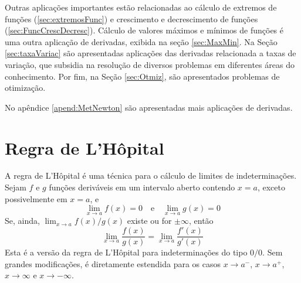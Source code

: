 \cleardoublepage\documentclass[../main.tex]{subfiles}
\begin{document}
 Outras aplicações importantes estão relacionadas ao cálculo de extremos de funções (\autoref{sec:extremosFunc}) e crescimento e decrescimento de funções (\autoref{sec:FuncCrescDecresc}). Cálculo de valores máximos e mínimos de funções é uma outra aplicação de derivadas, exibida na seção  \ref{sec:MaxMin}. Na Seção \ref{sec:taxaVariac} são apresentadas aplicações das derivadas relacionada a taxas de variação, que subsidia na resolução de diversos problemas em diferentes áreas do conhecimento. Por fim, na Seção \ref{sec:Otmiz}, são apresentados problemas de otimização.

No apêndice \ref{apend:MetNewton} são apresentadas mais aplicações de derivadas.

\section{Regra de L'Hôpital}\hypertarget{Lopital}{}\label{sec:lopital}
A \hypertarget{sec:lopital}{regra de L'Hôpital} é uma técnica para o cálculo de limites de indeterminações. Sejam $f$ e $g$ funções deriváveis em um intervalo aberto contendo $x=a$, exceto possivelmente em $x=a$, e
\begin{equation}
  \lim_{x\to a} f(x) = 0\quad\text{e}\quad\lim_{x\to a} g(x) = 0
\end{equation}
Se, ainda, $\lim_{x\to a} f(x)/g(x)$ existe ou for $\pm\infty$, então
\begin{equation}
  \lim_{x\to a} \frac{f(x)}{g(x)} = \lim_{x\to a} \frac{f'(x)}{g'(x)}
\end{equation}
Esta é a versão da regra de L'Hôpital para indeterminações do tipo $0/0$. Sem grandes modificações, é diretamente estendida para os casos $x\to a^-$, $x\to a^+$, $x\to \infty$ e $x\to -\infty$.\\
\end{document}
